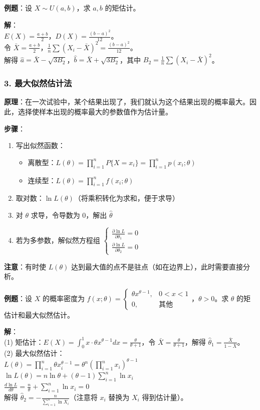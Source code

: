 \documentclass[12pt,a4paper]{ctexart}
\begin{document}
\textbf{例题}：设 $X \sim U(a, b)$，求 $a, b$ 的矩估计。

\textbf{解}：\\
$E(X) = \frac{a+b}{2}$，$D(X) = \frac{(b-a)^2}{12}$。\\
令 $\bar{X} = \frac{a+b}{2}$，$\frac{1}{n} \sum (X_i - \bar{X})^2 = \frac{(b-a)^2}{12}$。\\
解得 $\hat{a} = \bar{X} - \sqrt{3B_2}$，$\hat{b} = \bar{X} + \sqrt{3B_2}$，其中 $B_2 = \frac{1}{n} \sum (X_i - \bar{X})^2$。

\subsubsection{3. 最大似然估计法}
\textbf{原理}：在一次试验中，某个结果出现了，我们就认为这个结果出现的概率最大。因此，选择使样本出现的概率最大的参数值作为估计量。

\textbf{步骤}：
\begin{enumerate}[noitemsep]
    \item 写出似然函数：
          \begin{itemize}[noitemsep]
              \item 离散型：$L(\theta) = \prod_{i=1}^n P\{X = x_i\} = \prod_{i=1}^n p(x_i; \theta)$
              \item 连续型：$L(\theta) = \prod_{i=1}^n f(x_i; \theta)$
          \end{itemize}
    \item 取对数：$\ln L(\theta)$（将乘积转化为求和，便于求导）
    \item 对 $\theta$ 求导，令导数为 0，解出 $\hat{\theta}$
    \item 若为多参数，解似然方程组 $\begin{cases} \frac{\partial \ln L}{\partial \theta_1} = 0 \\ \frac{\partial \ln L}{\partial \theta_2} = 0 \end{cases}$
\end{enumerate}

\textbf{注意}：有时使 $L(\theta)$ 达到最大值的点不是驻点（如在边界上），此时需要直接分析。

\textbf{例题}：设 $X$ 的概率密度为 $f(x; \theta) = \begin{cases} \theta x^{\theta-1}, & 0 < x < 1 \\ 0, & \text{其他} \end{cases}$，$\theta > 0$。求 $\theta$ 的矩估计和最大似然估计。

\textbf{解}：\\
(1) 矩估计：$E(X) = \int_0^1 x \cdot \theta x^{\theta-1} dx = \frac{\theta}{\theta+1}$，令 $\bar{X} = \frac{\theta}{\theta+1}$，解得 $\hat{\theta}_1 = \frac{\bar{X}}{1-\bar{X}}$。\\
(2) 最大似然估计：\\
$L(\theta) = \prod_{i=1}^n \theta x_i^{\theta-1} = \theta^n (\prod_{i=1}^n x_i)^{\theta-1}$\\
$\ln L(\theta) = n \ln \theta + (\theta-1) \sum_{i=1}^n \ln x_i$\\
$\frac{d \ln L}{d\theta} = \frac{n}{\theta} + \sum_{i=1}^n \ln x_i = 0$\\
解得 $\hat{\theta}_2 = -\frac{n}{\sum_{i=1}^n \ln X_i}$（注意将 $x_i$ 替换为 $X_i$ 得到估计量）。
\end{document}
